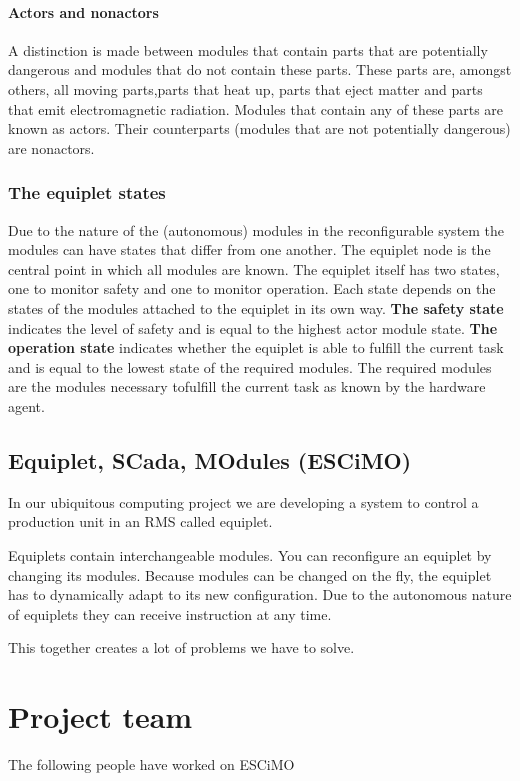 \documentclass[12pt,a4paper]{report}
\begin{document}
\subsubsection{Actors and nonactors}
A distinction is made between modules that contain parts that are potentially dangerous and modules that do not contain these parts. These parts are, amongst others, all moving parts,parts that heat up, parts that eject matter and parts that emit electromagnetic radiation. Modules that contain any of these parts are known as actors. Their counterparts (modules that are not potentially dangerous) are nonactors.\cite{mast_funcional_design}

\subsection{The equiplet states}
Due to the nature of the (autonomous) modules in the reconfigurable system the modules can have states that differ from one another. The equiplet node is the central point in which all modules are known. The equiplet itself has two states, one to monitor safety and one to monitor operation. Each state depends on the states of the modules attached to the equiplet in its own
way.
\textbf{The safety state} indicates the level of safety and is equal to the highest actor module state.
\textbf{The operation state} indicates whether the equiplet is able to fulfill the current task and is equal to the lowest state of the required modules. The required modules are the modules necessary tofulfill the current task as known by the hardware agent.\cite{mast_funcional_design}

\section{Equiplet, SCada, MOdules (ESCiMO)}
In our ubiquitous computing project we are developing a system to control a production unit in an RMS called equiplet. 

Equiplets contain interchangeable modules. 
You can reconfigure an equiplet by changing its modules.
Because modules can be changed on the fly, the equiplet has to dynamically adapt to its new configuration.
Due to the autonomous nature of equiplets they can receive instruction at any time.

This together creates a lot of problems we have to solve.

\chapter{Project team}
The following people have worked on ESCiMO
\end{document}
